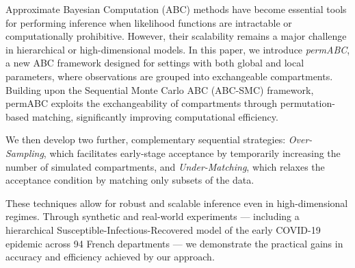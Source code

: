 Approximate Bayesian Computation (ABC) methods have become essential tools for performing inference when likelihood functions are intractable or computationally prohibitive. However, their scalability remains a major challenge in hierarchical or high-dimensional models. In this paper, we introduce \emph{permABC}, a new ABC framework designed for settings with both global and local parameters, where observations are grouped into exchangeable compartments.
Building upon the Sequential Monte Carlo ABC (ABC-SMC) framework, permABC exploits the exchangeability of compartments through permutation-based matching, significantly improving computational efficiency. 

We then develop two further, complementary sequential strategies: \emph{Over-Sampling}, which  facilitates early-stage acceptance by temporarily increasing the number of simulated compartments, and \emph{Under-Matching}, which relaxes the acceptance condition by matching only subsets of the data.

These techniques allow for robust and scalable inference even in high-dimensional regimes. Through synthetic and real-world experiments — including a hierarchical Susceptible-Infectious-Recovered model of the early COVID-19 epidemic across 94 French departments — we demonstrate the practical gains in accuracy and efficiency achieved by our approach.
\